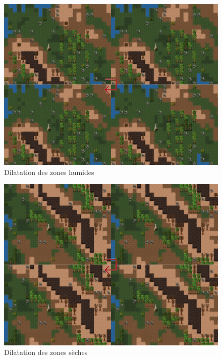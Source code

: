 \documentclass[a4paper]{article}
\begin{document}
          \begin{figure}
            \begin{center}
              \includegraphics[scale=0.2]{img/DilateNearFluid.png}
            \end{center}
            \caption{Dilatation des zones humides}
          \end{figure}
          \begin{figure}
            \begin{center}
              \includegraphics[scale=0.2]{img/DilateNearCliff.png}
            \end{center}
            \caption{Dilatation des zones sèches}
          \end{figure}
\end{document}
